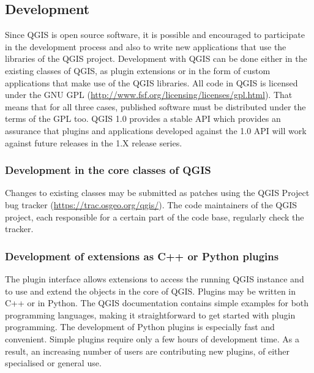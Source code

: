 \subsection{Development}


Since QGIS is open source software, it is possible and encouraged to participate
in the development
process and also to write new applications that use the libraries of the QGIS
project. Development with QGIS can be done either in the existing classes of
QGIS, as plugin extensions or in the form of custom applications that make use
of the QGIS libraries. All code in QGIS is licensed under the
GNU GPL (\url{http://www.fsf.org/licensing/licenses/gpl.html}). That means that
for all three cases, published software must be
distributed under the terms of the GPL too. QGIS 1.0 provides a stable API
which 
provides an assurance that plugins and applications developed against the 1.0
API 
will work against future releases in the 1.X release series.

\subsubsection{Development in the core classes of QGIS}
Changes to existing classes may be submitted as patches using the QGIS Project bug
tracker (\url{https://trac.osgeo.org/qgis/}). The code maintainers of the QGIS
project, each responsible for a certain part of the code base, regularly check
the tracker.

\subsubsection{Development of extensions as C++ or Python plugins}
The plugin interface allows extensions to access the running QGIS
instance and to use and extend the objects in the core of QGIS. Plugins may be
written in C++ or in Python. The QGIS documentation contains simple examples
for both programming languages, making it straightforward to get started with plugin 
programming. The development of Python plugins is especially fast and
convenient. Simple plugins require only a few hours of development time. As a result,
an increasing number of users are contributing new plugins, of either
specialised or general use.

